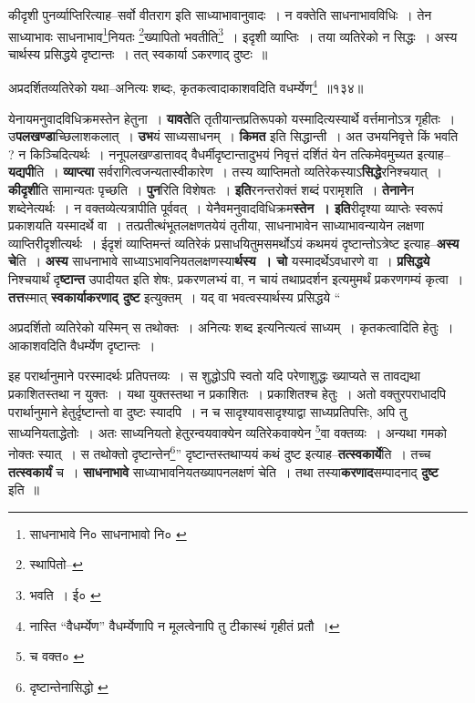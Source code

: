 \documentclass[article,12pt,a4paper]{memoir}
\begin{document}
	  \pstart कीदृशी पुनर्व्याप्तिरित्याह--सर्वो वीतराग इति साध्याभावानुवादः । न वक्तेति साधनाभावविधिः । तेन साध्याभावः साधनाभाव\footnote{साधनाभावे नि० \cite{dp-msD} साधनाभावो नि० \cite{dp-msC}}नियतः \footnote{स्थापितो--\cite{dp-msA}}ख्यापितो भवतीति\footnote{भवति । ई० \cite{dp-msD} \cite{dp-msB}} । इदृशी व्याप्तिः । तया व्यतिरेको न सिद्धः । अस्य चार्थस्य प्रसिद्धये दृष्टान्तः । तत् स्वकार्या ऽकरणाद् दुष्टः ॥
	\pend
       
	  \bigskip
	  \begingroup
	

	  \pstart अप्रदर्शितव्यतिरेको यथा--अनित्यः शब्दः, कृतकत्वादाकाशवदिति वधर्म्येण\footnote{नास्ति “वैधर्म्येण” \cite{dp-edE} वैधर्म्येणापि \cite{dp-msB} \cite{dp-msD} \cite{dp-edP} \cite{dp-edH} न मूलत्वेनापि तु टीकास्थं गृहीतं \cite{dp-edN} प्रतौ ।} ॥१३४॥
	\pend
      
	  \endgroup
	
	  \endgroup
	

	  \pstart येनायमनुवादविधिक्रमस्तेन हेतुना । \textbf{यावते}ति तृतीयान्तप्रतिरूपको यस्मादित्यस्यार्थे वर्त्तमानोऽत्र गृहीतः । उ\leavevmode{}\textbf{पलखण्डा}च्छिलाशकलात् । \textbf{उभ}यं साध्यसाधनम् । \textbf{किमत} इति सिद्धान्ती । अत उभयनिवृत्ते किं भवति ? न किञ्चिदित्यर्थः । ननूपलखण्डात्तावद् वैधर्मीदृष्टान्तादुभयं निवृत्तं दर्शितं येन तत्किमेवमुच्यत इत्याह--\textbf{यद्यपी}ति । \textbf{व्याप्त्या} सर्वरागित्वजन्यतास्वीकारेण । तस्य व्याप्तिमतो व्यतिरेकस्याऽ\textbf{सिद्धे}रनिश्चयात् । \textbf{कीदृशी}ति सामान्यतः पृच्छति । \textbf{पुन}रिति विशेषतः । \textbf{इति}रनन्तरोक्तं शब्दं परामृशति । \textbf{तेनाने}न शब्देनेत्यर्थः । न वक्तव्येत्यत्रापीति पूर्ववत् । येनैवमनुवादविधिक्रम\textbf{स्तेन । इति}रीदृश्या व्याप्तेः स्वरूपं प्रकाशयति यस्मादर्थे वा । तत्प्रतीत्थंभूतलक्षणतयेयं तृतीया, साधनाभावेन साध्याभावन्यायेन लक्षणा व्याप्तिरीदृशीत्यर्थः । ईदृशं व्याप्तिमन्तं व्यतिरेकं प्रसाधयितुमसमर्थोऽयं कथमयं दृष्टान्तोऽत्रेष्ट इत्याह--\textbf{अस्य चे}ति । \textbf{अस्य} साधनाभावे साध्याऽभावनियतलक्षणस्या\textbf{र्थस्य । चो} यस्मादर्थेऽवधारणे वा । \textbf{प्रसिद्धये} निश्चयार्थं दृ\textbf{ष्टान्त} उपादीयत इति शेषः, प्रकरणलभ्यं वा, न चायं तथाप्रदर्शन इत्यमुमर्थं प्रकरणगम्यं कृत्वा । \textbf{तत्त}स्मात् \textbf{स्वकार्याकरणाद् दुष्ट} इत्युक्तम् । यद् वा भवत्वस्यार्थस्य प्रसिद्धये          \leavevmode{} “
	  
	अप्रदर्शितो व्यतिरेको यस्मिन् स तथोक्तः । अनित्यः शब्द इत्यनित्यत्वं साध्यम् । कृतकत्वादिति हेतुः । आकाशवदिति वैधर्म्येण दृष्टान्तः । 
	  
	इह परार्थानुमाने परस्मादर्थः प्रतिपत्तव्यः । स शुद्धोऽपि स्वतो यदि परेणाशुद्धः ख्याप्यते स तावद्यथा प्रकाशितस्तथा न युक्तः । यथा युक्तस्तथा न प्रकाशितः । प्रकाशितश्च हेतुः । अतो वक्तुरपराधादपि परार्थानुमाने हेतुर्दृष्टान्तो वा दुष्टः स्यादपि । न च सादृश्यावसादृश्याद्वा साध्यप्रतिपत्तिः, अपि तु साध्यनियताद्धेतोः । अतः साध्यनियतो हेतुरन्वयवाक्येन व्यतिरेकवाक्येन \footnote{च वक्त० \cite{dp-msA} \cite{dp-msB} \cite{dp-edP} \cite{dp-edH} \cite{dp-edE} \cite{dp-edN}}वा वक्तव्यः । अन्यथा गमको नोक्तः स्यात् । स तथोक्तो दृष्टान्तेन\footnote{दृष्टान्तेनासिद्धो \cite{dp-msB}}” दृष्टान्तस्तथाप्ययं कथं दुष्ट इत्याह--\textbf{तत्स्वकार्ये}ति । तच्च \textbf{तत्स्वकार्यं} च । \textbf{साधनाभावे} साध्याभावनियतख्यापनलक्षणं चेति । तथा तस्या\textbf{करणाद}सम्पादनाद् \textbf{दुष्ट} इति ॥
	\pend
      
\end{document}
